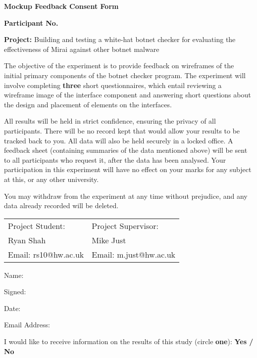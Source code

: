 \begin{center}
	\textbf{Mockup Feedback Consent Form}\par
	\textbf{Participant No.}\par
	\textbf{Project:} Building and testing a white-hat botnet checker for evaluating the effectiveness of Mirai against other botnet malware
\end{center}

The objective of the experiment is to provide feedback on wireframes of the initial primary components of the botnet checker program. The experiment will involve completing \textbf{three} short questionnaires, which entail reviewing a wireframe image of the interface component and answering short questions about the design and placement of elements on the interfaces.

\vspace{0.5cm}

All results will be held in strict confidence, ensuring the privacy of all participants. There will be no record kept that would allow your results to be tracked back to you. All data will also be held securely in a locked office. A feedback sheet (containing summaries of the data mentioned above) will be sent to all participants who request it, after the data has been analysed. Your participation in this experiment will have no effect on your marks for any subject at this, or any other university.

\vspace{0.5cm}

You may withdraw from the experiment at any time without prejudice, and any data already recorded will be deleted.

\vspace{0.5cm}

\begin{table}[h]
\centering
\begin{tabular}{ll}
\hline
Project Student:     & Project Supervisor:    \\
Ryan Shah            & Mike Just              \\
Email: rs10@hw.ac.uk & Email: m.just@hw.ac.uk \\ \hline
\end{tabular}
\end{table}

Name:\par
Signed:\par
Date:\par
Email Address:\par

\vspace{0.5cm}

I would like to receive information on the results of this study (circle \textbf{one}): \textbf{Yes / No}
